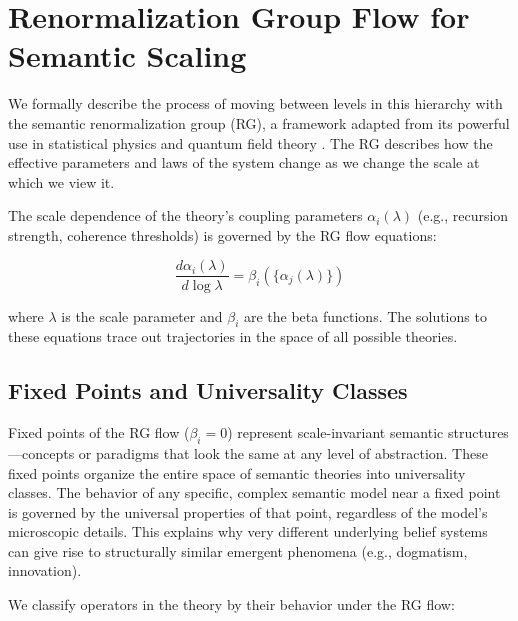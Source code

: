 
\section{Renormalization Group Flow for Semantic Scaling}
\label{sec:renormalization_group_flow_for_semantic_scaling}

We formally describe the process of moving between levels in this hierarchy with the semantic renormalization group (RG), a framework adapted from its powerful use in statistical physics and quantum field theory \autocite{Wilson1971, Cardy1996}. The RG describes how the effective parameters and laws of the system change as we change the scale at which we view it.

The scale dependence of the theory's coupling parameters \(\alpha_i(\lambda)\) (e.g., recursion strength, coherence thresholds) is governed by the RG flow equations:

\begin{equation}
\frac{d\alpha_i(\lambda)}{d\log\lambda} = \beta_i(\{\alpha_j(\lambda)\})
\end{equation}

where \(\lambda\) is the scale parameter and \(\beta_i\) are the beta functions. The solutions to these equations trace out trajectories in the space of all possible theories.


\subsection{Fixed Points and Universality Classes}
\label{sec:fixed_points_and_universality_classes}

Fixed points of the RG flow (\(\beta_i = 0\)) represent scale-invariant semantic structures—concepts or paradigms that look the same at any level of abstraction. These fixed points organize the entire space of semantic theories into universality classes. The behavior of any specific, complex semantic model near a fixed point is governed by the universal properties of that point, regardless of the model's microscopic details. This explains why very different underlying belief systems can give rise to structurally similar emergent phenomena (e.g., dogmatism, innovation).

We classify operators in the theory by their behavior under the RG flow:

